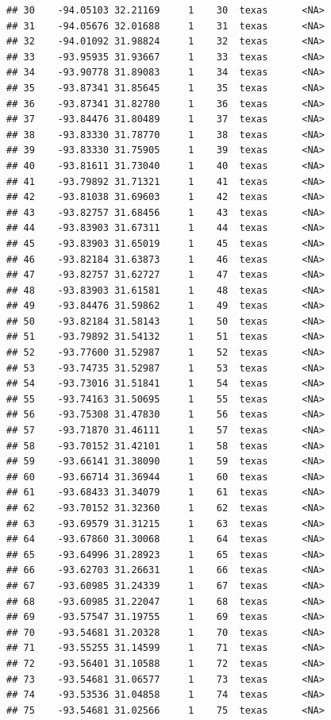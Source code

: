 \documentclass[
]{article}
\begin{document}
\begin{verbatim}
## 30    -94.05103 32.21169     1    30  texas      <NA>
## 31    -94.05676 32.01688     1    31  texas      <NA>
## 32    -94.01092 31.98824     1    32  texas      <NA>
## 33    -93.95935 31.93667     1    33  texas      <NA>
## 34    -93.90778 31.89083     1    34  texas      <NA>
## 35    -93.87341 31.85645     1    35  texas      <NA>
## 36    -93.87341 31.82780     1    36  texas      <NA>
## 37    -93.84476 31.80489     1    37  texas      <NA>
## 38    -93.83330 31.78770     1    38  texas      <NA>
## 39    -93.83330 31.75905     1    39  texas      <NA>
## 40    -93.81611 31.73040     1    40  texas      <NA>
## 41    -93.79892 31.71321     1    41  texas      <NA>
## 42    -93.81038 31.69603     1    42  texas      <NA>
## 43    -93.82757 31.68456     1    43  texas      <NA>
## 44    -93.83903 31.67311     1    44  texas      <NA>
## 45    -93.83903 31.65019     1    45  texas      <NA>
## 46    -93.82184 31.63873     1    46  texas      <NA>
## 47    -93.82757 31.62727     1    47  texas      <NA>
## 48    -93.83903 31.61581     1    48  texas      <NA>
## 49    -93.84476 31.59862     1    49  texas      <NA>
## 50    -93.82184 31.58143     1    50  texas      <NA>
## 51    -93.79892 31.54132     1    51  texas      <NA>
## 52    -93.77600 31.52987     1    52  texas      <NA>
## 53    -93.74735 31.52987     1    53  texas      <NA>
## 54    -93.73016 31.51841     1    54  texas      <NA>
## 55    -93.74163 31.50695     1    55  texas      <NA>
## 56    -93.75308 31.47830     1    56  texas      <NA>
## 57    -93.71870 31.46111     1    57  texas      <NA>
## 58    -93.70152 31.42101     1    58  texas      <NA>
## 59    -93.66141 31.38090     1    59  texas      <NA>
## 60    -93.66714 31.36944     1    60  texas      <NA>
## 61    -93.68433 31.34079     1    61  texas      <NA>
## 62    -93.70152 31.32360     1    62  texas      <NA>
## 63    -93.69579 31.31215     1    63  texas      <NA>
## 64    -93.67860 31.30068     1    64  texas      <NA>
## 65    -93.64996 31.28923     1    65  texas      <NA>
## 66    -93.62703 31.26631     1    66  texas      <NA>
## 67    -93.60985 31.24339     1    67  texas      <NA>
## 68    -93.60985 31.22047     1    68  texas      <NA>
## 69    -93.57547 31.19755     1    69  texas      <NA>
## 70    -93.54681 31.20328     1    70  texas      <NA>
## 71    -93.55255 31.14599     1    71  texas      <NA>
## 72    -93.56401 31.10588     1    72  texas      <NA>
## 73    -93.54681 31.06577     1    73  texas      <NA>
## 74    -93.53536 31.04858     1    74  texas      <NA>
## 75    -93.54681 31.02566     1    75  texas      <NA>

\end{verbatim}
\end{document}
